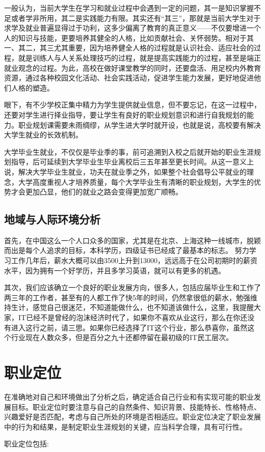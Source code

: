\documentclass{article}
\begin{document}
一般认为，当前大学生在学习和就业过程中会遇到一定的问题，其一是知识掌握不足或者学非所用，其二是实践能力有限。其实还有“其三”，那就是当前大学生对于求学及就业普遍显得过于功利，这多少偏离了教育的真正意义——不仅要增进一个人的知识与技能，更要培养其健全的人格，比如贡献社会、关怀弱势。相对于其一、其二，其三尤其重要，因为培养健全人格的过程就是认识社会、适应社会的过程，就是训练人与人关系处理技巧的过程，就是提高实践能力的过程，甚至是端正就业观念的过程。为此，高校在做好课堂教学的同时，还要盘活、用足校内外教育资源，通过各种校园文化活动、社会实践活动，促进学生能力发展，更好地促进他们人格的塑造。\par

眼下，有不少学校正集中精力为学生提供就业信息，但不要忘记，在这一过程中，还要对学生进行择业指导，要让学生有良好的职业规划意识和进行自我规划的能力。职业规划课需要未雨绸缪，从学生进大学时就开设，也就是说，高校要有解决大学生就业的长效机制。\par

大学毕业生就业，不仅仅是毕业季的事，前可追溯到入校之后就开始的职业生涯规划指导，后可延续到大学毕业生毕业离校后三五年甚至更长时间。从这一意义上说，解决大学毕业生就业，功夫在就业季之外，如果整个社会倡导公平就业的理念，大学高度重视人才培养质量，每个大学毕业生有清晰的职业规划，大学生的优势才会更加凸显，他们的就业之路会变得更加宽广顺畅。\par


\subsection{地域与人际环境分析}
首先，在中国这么一个人口众多的国家，尤其是在北京、上海这种一线城市，脱颖而出是每个人追求的目标，本科学历，四级证书已经成了最基本的标志。
努力学习工作几年后，薪水大概可以由3500上升到13000，远远高于在公司初期时的薪资水平，因为拥有一个好学历，并且多学习英语，就可以有更多的机遇。\par
其次，我们应该确立一个良好的职业发展方向，很多人，包括应届毕业生和工作了两三年的工作者，甚至有的人都工作了快5年的时间，仍然拿很低的薪水，勉强维持生计，感觉自己很迷茫，不知道能做什么，也不知道该做什么，这里，我提醒大家，IT已经不是曾经的泡沫经济时代了，如果你不喜欢从业这行，那么在你还没有进入这行之前，请三思。如果你已经选择了IT这个行业，那么恭喜你，虽然这个行业现在人数众多，但是百分之九十还都停留在最初级的IT民工层次。
\par 

\section{职业定位}
在准确地对自己和环境做出了分析之后，确定适合自己行业和有实现可能的职业发展目标。职业定位时要注意与自己的自然条件、知识背景、技能特长、性格特点、兴趣爱好是否匹配，考虑与自己所处的环境是否相适应。职业定位决定了职业发展中的行为和结果，是制定职业生涯规划的关键，应当科学合理，具有可行性。\par
职业定位包括:\par
\end{document}
